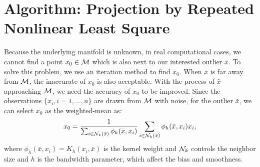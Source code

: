 \documentclass{article}
\newtheorem{theorem}{Theorem}[section]
\theoremstyle{remark}
\begin{document}
%
%
\section{Algorithm: Projection by Repeated Nonlinear Least Square}\label{nonlinear projection}
Because the underlying manifold is unknown, in real computational cases,  we cannot find a point $x_0\in \cal M$ which is also next to our interested outlier $\bar{x}$. To solve this problem, we use an iteration method to find $x_0$. When $\bar{x}$ is far away from $\cal M$, the inaccurate of $x_0$ is also acceptable. With the process of $\bar{x}$ approaching $\cal M$, we need the accuracy of  $x_0$ to be improved.
Since the observations $\{x_i, i=1,...,n\}$ are drawn from $\cal M$ with noise, for the outlier $\bar{x}$, we can select $x_0$ as the weighted-mean as:
\begin{equation}\label{weighted_mean}
x_0 =\frac{1}{\sum_{i\in {\cal N}_k(\bar{x}) } \phi_h(\bar{x},x_i)} \sum_{i\in {\cal N}_k (\bar{x})} \phi_h(\bar{x},x_i)x_i,
\end{equation}
where $\phi_h(\bar{x},x_i) = K_h(x_i, \bar{x})$ is the kernel weight and ${\cal N}_k$ controls the neighbor size and $h$ is the bandwidth parameter, which affect the bias and smoothness.
\end{document}
